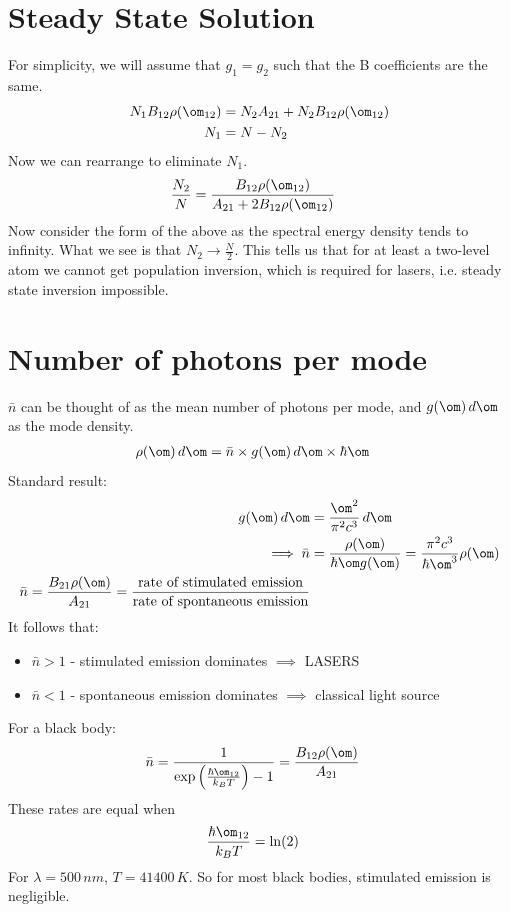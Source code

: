 \documentclass[a4paper, 11pt, normalem]{report}
\begin{document}
\section{Steady State Solution}
For simplicity, we will assume that $g_1=g_2$ such that the B coefficients are the same. 
\begin{align}
    N_1B_{12}\rho(\om_{12}) &= N_2A_{21} + N_2B_{12}\rho(\om_{12}) \\
    N_1 &= N - N_2
\end{align}
Now we can rearrange to eliminate $N_1$.
\begin{align}
    \frac{N_2}{N} &= \frac{B_{12}\rho(\om_{12})}{A_{21}+2B_{12}\rho(\om_{12})}
\end{align}
Now consider the form of the above as the spectral energy density tends to infinity. 
What we see  is that $N_2 \to \frac{N}{2}$.
This tells us that for at least a two-level atom we cannot get population inversion, which is required for lasers, i.e. steady state inversion impossible.

\section{Number of photons per mode}
$\bar{n}$ can be thought of as the mean number of photons per mode, and $g(\om)\,d\om$ as the mode density. 
\begin{align}
    \rho(\om)\,d\om &= \bar{n} \times g(\om)\,d\om \times \hbar\om
\end{align}
Standard result:
\begin{align}
    g(\om)\,d\om &= \frac{\om^2}{\pi^2c^3}\,d\om \\
    \implies \bar{n} &= \frac{\rho(\om)}{\hbar\om g(\om)} = \frac{\pi^2c^3}{\hbar\om^3}\rho(\om)\\
    \bar{n} = \frac{B_{21}\rho(\om)}{A_{21}} = \frac{\text{rate of stimulated emission}}{\text{rate of spontaneous emission}}
\end{align}
It follows that:
\begin{itemize}
    \item $\bar{n}>1$ - stimulated emission dominates $\implies$ LASERS
    \item $\bar{n}<1$ - spontaneous emission dominates $\implies$ classical light source
\end{itemize}
For a black body:
\begin{align}
    \bar{n} &= \frac{1}{\exp\left(\frac{\hbar\om_{12}}{k_BT}\right) -1} = \frac{B_{12}\rho(\om)}{A_{21}}
\end{align}
These rates are equal when
\begin{align}
    \frac{\hbar\om_{12}}{k_BT} &= \ln(2)
\end{align}
For $\lambda=500\,nm$, $T= 41400\,K$. So for most black bodies, stimulated emission is negligible.
\end{document}
